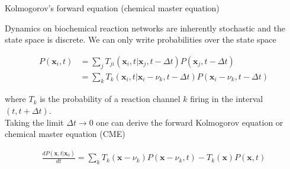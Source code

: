 \documentclass[aspectratio=1610]{beamer}					%
\begin{document}
\begin{frame}{Kolmogorov's forward equation (chemical master equation)}

Dynamics on biochemical reaction networks are inherently stochastic and the state space is discrete. We can only write probabilities over the state space

\vspace{0.1in}

\begin{align*}
P(\mathbf{x}_{i},t) &= \sum_{j} T_{ji}(\mathbf{x}_{i},t|\mathbf{x}_{j},t-\Delta t)P(\mathbf{x}_{j},t-\Delta t)\\ 
&= \sum_{k} T_{k}(\mathbf{x}_{i},t|\mathbf{x}_{i}-\nu_{k},t-\Delta t)P(\mathbf{x}_{i}-\nu_{k},t-\Delta t)
\end{align*}

where $T_{k}$ is the probability of a reaction channel $k$ firing in the interval $(t,t+\Delta t)$.\\
\vspace{0.1in}
Taking the limit $\Delta t \rightarrow 0$ one can derive the forward Kolmogorov equation or chemical master equation (CME)

\begin{align*}
\frac{dP(\mathbf{x},t|\mathbf{x}_{0})}{dt} = \sum_{k} T_{k}(\mathbf{x}-\nu_{k})P(\mathbf{x}-\nu_{k},t) - T_{k}(\mathbf{x})P(\mathbf{x},t)
\end{align*}

\end{frame}
\end{document}
